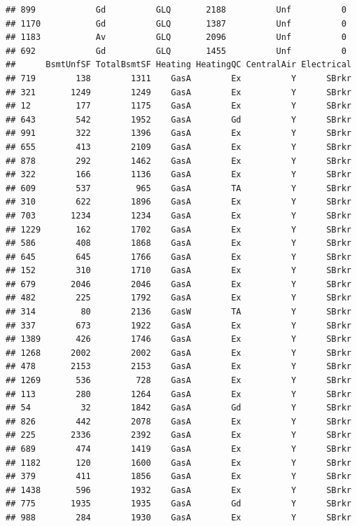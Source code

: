 \documentclass[]{article}
\begin{document}
\begin{verbatim}
## 899            Gd          GLQ       2188          Unf          0
## 1170           Gd          GLQ       1387          Unf          0
## 1183           Av          GLQ       2096          Unf          0
## 692            Gd          GLQ       1455          Unf          0
##      BsmtUnfSF TotalBsmtSF Heating HeatingQC CentralAir Electrical
## 719        138        1311    GasA        Ex          Y      SBrkr
## 321       1249        1249    GasA        Ex          Y      SBrkr
## 12         177        1175    GasA        Ex          Y      SBrkr
## 643        542        1952    GasA        Gd          Y      SBrkr
## 991        322        1396    GasA        Ex          Y      SBrkr
## 655        413        2109    GasA        Ex          Y      SBrkr
## 878        292        1462    GasA        Ex          Y      SBrkr
## 322        166        1136    GasA        Ex          Y      SBrkr
## 609        537         965    GasA        TA          Y      SBrkr
## 310        622        1896    GasA        Ex          Y      SBrkr
## 703       1234        1234    GasA        Ex          Y      SBrkr
## 1229       162        1702    GasA        Ex          Y      SBrkr
## 586        408        1868    GasA        Ex          Y      SBrkr
## 645        645        1766    GasA        Ex          Y      SBrkr
## 152        310        1710    GasA        Ex          Y      SBrkr
## 679       2046        2046    GasA        Ex          Y      SBrkr
## 482        225        1792    GasA        Ex          Y      SBrkr
## 314         80        2136    GasW        TA          Y      SBrkr
## 337        673        1922    GasA        Ex          Y      SBrkr
## 1389       426        1746    GasA        Ex          Y      SBrkr
## 1268      2002        2002    GasA        Ex          Y      SBrkr
## 478       2153        2153    GasA        Ex          Y      SBrkr
## 1269       536         728    GasA        Ex          Y      SBrkr
## 113        280        1264    GasA        Ex          Y      SBrkr
## 54          32        1842    GasA        Gd          Y      SBrkr
## 826        442        2078    GasA        Ex          Y      SBrkr
## 225       2336        2392    GasA        Ex          Y      SBrkr
## 689        474        1419    GasA        Ex          Y      SBrkr
## 1182       120        1600    GasA        Ex          Y      SBrkr
## 379        411        1856    GasA        Ex          Y      SBrkr
## 1438       596        1932    GasA        Ex          Y      SBrkr
## 775       1935        1935    GasA        Gd          Y      SBrkr
## 988        284        1930    GasA        Ex          Y      SBrkr

\end{verbatim}
\end{document}
